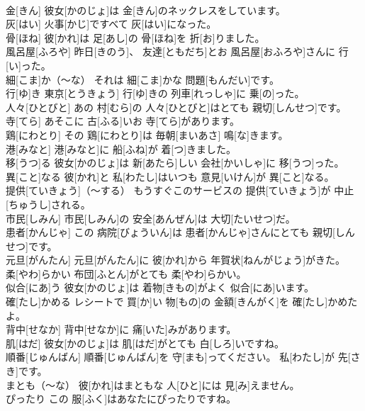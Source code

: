 \documentclass[8pt]{extreport}
\begin{document}
\begin{CJK}{UTF8}{min}
\\	金[きん]	彼女[かのじょ]は 金[きん]のネックレスをしています。		
\\	灰[はい]	火事[かじ]ですべて 灰[はい]になった。		
\\	骨[ほね]	彼[かれ]は 足[あし]の 骨[ほね]を 折[お]りました。		
\\	風呂屋[ふろや]	昨日[きのう]、 友達[ともだち]とお 風呂屋[おふろや]さんに 行[い]った。		
\\	細[こま]か（～な）	それは 細[こま]かな 問題[もんだい]です。		
\\	行[ゆ]き	東京[とうきょう] 行[ゆ]きの 列車[れっしゃ]に 乗[の]った。		
\\	人々[ひとびと]	あの 村[むら]の 人々[ひとびと]はとても 親切[しんせつ]です。		
\\	寺[てら]	あそこに 古[ふる]いお 寺[てら]があります。		
\\	鶏[にわとり]	その 鶏[にわとり]は 毎朝[まいあさ] 鳴[な]きます。		
\\	港[みなと]	港[みなと]に 船[ふね]が 着[つ]きました。		
\\	移[うつ]る	彼女[かのじょ]は 新[あたら]しい 会社[かいしゃ]に 移[うつ]った。		
\\	異[こと]なる	彼[かれ]と 私[わたし]はいつも 意見[いけん]が 異[こと]なる。		
\\	提供[ていきょう]（～する）	もうすぐこのサービスの 提供[ていきょう]が 中止[ちゅうし]される。		
\\	市民[しみん]	市民[しみん]の 安全[あんぜん]は 大切[たいせつ]だ。		
\\	患者[かんじゃ]	この 病院[びょういん]は 患者[かんじゃ]さんにとても 親切[しんせつ]です。		
\\	元旦[がんたん]	元旦[がんたん]に 彼[かれ]から 年賀状[ねんがじょう]がきた。		
\\	柔[やわ]らかい	布団[ふとん]がとても 柔[やわ]らかい。		
\\	似合[にあ]う	彼女[かのじょ]は 着物[きもの]がよく 似合[にあ]います。		
\\	確[たし]かめる	レシートで 買[か]い 物[もの]の 金額[きんがく]を 確[たし]かめたよ。		
\\	背中[せなか]	背中[せなか]に 痛[いた]みがあります。		
\\	肌[はだ]	彼女[かのじょ]は 肌[はだ]がとても 白[しろ]いですね。		
\\	順番[じゅんばん]	順番[じゅんばん]を 守[まも]ってください。 私[わたし]が 先[さき]です。		
\\	まとも（～な）	彼[かれ]はまともな 人[ひと]には 見[み]えません。		
\\	ぴったり	この 服[ふく]はあなたにぴったりですね。		

\end{CJK}
\end{document}
